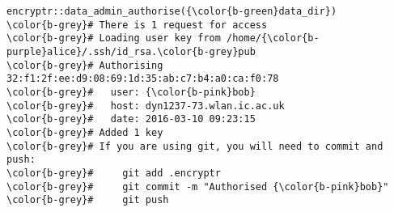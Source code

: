 \documentclass[class=minimal,border=0]{standalone}
\begin{document}
%
\begin{BVerbatim}[bgcolor=b-darkgrey]
encryptr::data_admin_authorise({\color{b-green}data_dir})
\color{b-grey}# There is 1 request for access
\color{b-grey}# Loading user key from /home/{\color{b-purple}alice}/.ssh/id_rsa.\color{b-grey}pub
\color{b-grey}# Authorising 32:f1:2f:ee:d9:08:69:1d:35:ab:c7:b4:a0:ca:f0:78
\color{b-grey}#   user: {\color{b-pink}bob}
\color{b-grey}#   host: dyn1237-73.wlan.ic.ac.uk
\color{b-grey}#   date: 2016-03-10 09:23:15
\color{b-grey}# Added 1 key
\color{b-grey}# If you are using git, you will need to commit and push:
\color{b-grey}#     git add .encryptr
\color{b-grey}#     git commit -m "Authorised {\color{b-pink}bob}"
\color{b-grey}#     git push
\end{BVerbatim}
\end{document}
